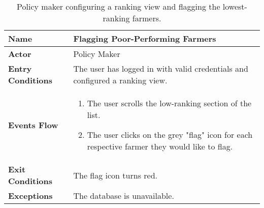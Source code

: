 
\begin{table}
\centering
\small
\caption{\label{tab:addOne{table_counter}}Policy maker configuring a ranking view and flagging the lowest-ranking farmers.}
\renewcommand{\arraystretch}{1.25}
\begin{tabular}{|l|>{\raggedright\arraybackslash}m{12cm}|}
    \hline
    \textbf{Name} & Flagging Poor-Performing Farmers\\
    \hline
   	\textbf{Actor} & Policy Maker\\
    \hline
    \textbf{Entry Conditions} & The user has logged in with valid credentials and configured a ranking view.\\
    \hline
    \textbf{Events Flow} & 
    \begin{enumerate}
    	\item The user scrolls the low-ranking section of the list.
    	\item The user clicks on the grey "flag" icon for each respective farmer they would like to flag. 
    \end{enumerate}\\
    \hline
    \textbf{Exit Conditions} & The flag icon turns red.\\
    \hline
    \textbf{Exceptions} & The database is unavailable.\\
    \hline
\end{tabular}
\end{table}